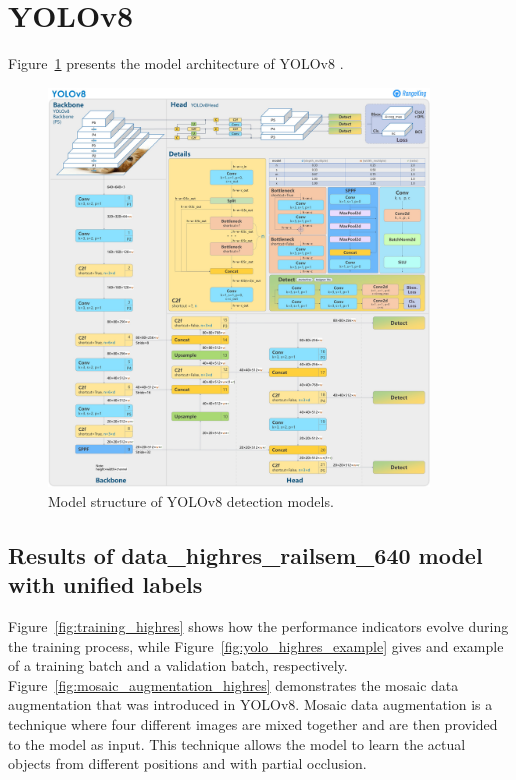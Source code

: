 \documentclass[Master,MDS,english]{BASE/twbook} %
\begin{document}
\section{YOLOv8} \label{app:yolo}

Figure~\ref{fig:yolo_architecture} presents the model architecture of YOLOv8 \citep{RangeKing}.

\begin{figure}[h]
\centering
\includegraphics[width=0.9\textwidth]{images/yolo/architecture}
\caption{Model structure of YOLOv8 detection models. }
\label{fig:yolo_architecture}
\end{figure}

\subsection{Results of data\_highres\_railsem\_640 model with unified labels}

Figure~\ref{fig:training_highres} shows how the performance indicators evolve during the training process, while Figure~\ref{fig:yolo_highres_example} gives and example of a training batch and a validation batch, respectively.
Figure~\ref{fig:mosaic_augmentation_highres} demonstrates the mosaic data augmentation that was introduced in YOLOv8. 
Mosaic data augmentation is a technique where four different images are mixed together and are then provided to the model as input. This technique allows the model to learn the actual objects from different positions and with partial occlusion. 
\end{document}
